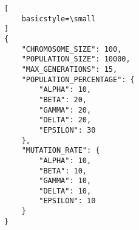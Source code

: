 \begin{lstlisting}[
    basicstyle=\small
]
{
    "CHROMOSOME_SIZE": 100,
    "POPULATION_SIZE": 10000,
    "MAX_GENERATIONS": 15,
    "POPULATION_PERCENTAGE": {
        "ALPHA": 10,
        "BETA": 20,
        "GAMMA": 20,
        "DELTA": 20,
        "EPSILON": 30
    },
    "MUTATION_RATE": {
        "ALPHA": 10,
        "BETA": 10,
        "GAMMA": 10,
        "DELTA": 10,
        "EPSILON": 10
    }
}
   
\end{lstlisting}


